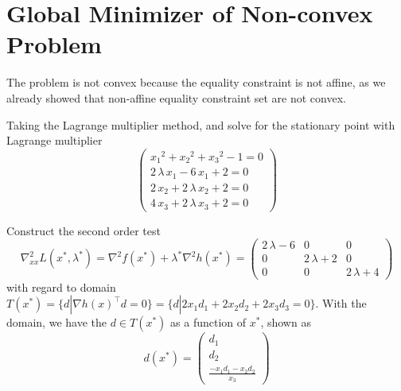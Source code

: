  



\newcommand{\mbf}{\mathbf}
\newcommand{\T}{^\intercal}
\newcommand{\partialgx}{\frac{\partial g(\mathbf{x})}{\partial\mathbf{x}}}
\newcommand{\partialgl}{\frac{\partial g(\mathbf{x})}{\partial\mathbf{\lambda}}}


\section{Global Minimizer of Non-convex Problem}

The problem is not convex because the equality constraint is not affine, as we already showed that non-affine equality constraint set are not convex.

Taking the Lagrange multiplier method, and solve for the stationary point with Lagrange multiplier
\[
\left(\begin{array}{c}
{x_1 }^2 +{x_2 }^2 +{x_3 }^2 -1 = 0\\
2\,\lambda \,x_1 -6\,x_1 +2 = 0\\
2\,x_2 +2\,\lambda \,x_2 +2 = 0\\
4\,x_3 +2\,\lambda \,x_3 +2 = 0
\end{array}\right)
\]

Construct the second order test
\[
\nabla^2_{xx}L(x^*, \lambda^*) = \nabla^2f(x^*) + \lambda^* \nabla^2h(x^*) = \left(\begin{array}{ccc}
2\,\lambda -6 & 0 & 0\\
0 & 2\,\lambda +2 & 0\\
0 & 0 & 2\,\lambda +4
\end{array}\right) 
\]
with regard to domain $T(x^*) = \{d | \nabla h(x)^\intercal d = 0\} = \{d | 2x_1d_1 + 2x_2d_2 + 2x_3d_3 = 0\}$. With the domain, we have the $d \in T(x^*)$ as a function of $x^*$, shown as
\[
d(x^*) = \left(\begin{array}{c}
     d_1 \\
     d_2 \\
     \frac{-x_1d_1 - x_2d_2}{x_3}
\end{array}\right)
\]

